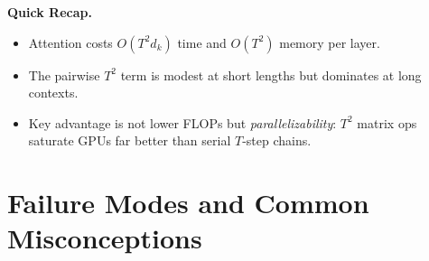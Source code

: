 \begin{quickrecap}
\textbf{Quick Recap.}
\begin{itemize}[nosep,leftmargin=1.5em]
  \item Attention costs $O(T^2 d_k)$ time and $O(T^2)$ memory per layer.
  \item The pairwise $T^2$ term is modest at short lengths but dominates at long contexts.
  \item Key advantage is not lower FLOPs but \emph{parallelizability}: $T^2$ matrix ops saturate GPUs far better than serial $T$-step chains.
\end{itemize}
\end{quickrecap}

\section{Failure Modes and Common Misconceptions}

